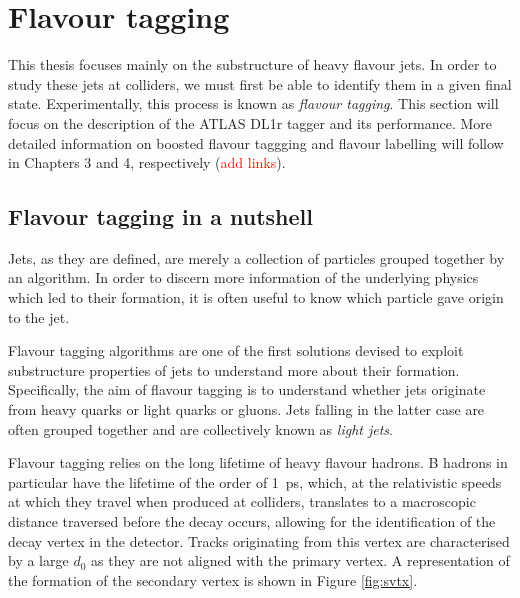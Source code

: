 \documentclass[10pt,a4paper]{book}
\begin{document}
\section{Flavour tagging}

This thesis focuses mainly on the substructure of heavy flavour jets. In order to study these jets at colliders, we must first be able to identify them in a given final state. Experimentally, this process is known as \emph{flavour tagging}. This section will focus on the description of the ATLAS DL1r tagger and its performance. More detailed information on boosted flavour taggging and flavour labelling will follow in Chapters 3 and 4, respectively (\textcolor{red}{add links}).

\subsection{Flavour tagging in a nutshell}

Jets, as they are defined, are merely a collection of particles grouped together by an algorithm. In order to discern more information of the underlying physics which led to their formation, it is often useful to know which particle gave origin to the jet.

Flavour tagging algorithms are one of the first solutions devised to exploit substructure properties of jets to understand more about their formation. Specifically, the aim of flavour tagging is to understand whether jets originate from heavy quarks or light quarks or gluons. Jets falling in the latter case are often grouped together and are collectively known as \emph{light jets}.

Flavour tagging relies on the long lifetime of heavy flavour hadrons. B hadrons in particular have the lifetime of the order of 1~ps, which, at the relativistic speeds at which they travel when produced at colliders, translates to a macroscopic distance traversed before the decay occurs, allowing for the identification of the decay vertex in the detector. Tracks originating from this vertex are characterised by a large $d_0$ as they are not aligned with the primary vertex. A representation of the formation of the secondary vertex is shown in Figure \ref{fig:svtx}.
\end{document}
